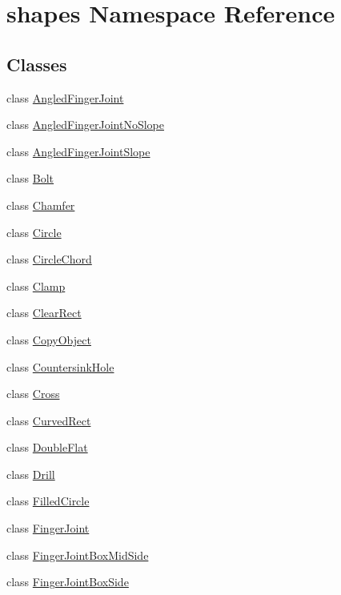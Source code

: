 \hypertarget{namespaceshapes}{}\section{shapes Namespace Reference}
\label{namespaceshapes}
\subsection*{Classes}
\begin{DoxyCompactItemize}
\item 
class \hyperlink{classshapes_1_1_angled_finger_joint}{Angled\+Finger\+Joint}
\item 
class \hyperlink{classshapes_1_1_angled_finger_joint_no_slope}{Angled\+Finger\+Joint\+No\+Slope}
\item 
class \hyperlink{classshapes_1_1_angled_finger_joint_slope}{Angled\+Finger\+Joint\+Slope}
\item 
class \hyperlink{classshapes_1_1_bolt}{Bolt}
\item 
class \hyperlink{classshapes_1_1_chamfer}{Chamfer}
\item 
class \hyperlink{classshapes_1_1_circle}{Circle}
\item 
class \hyperlink{classshapes_1_1_circle_chord}{Circle\+Chord}
\item 
class \hyperlink{classshapes_1_1_clamp}{Clamp}
\item 
class \hyperlink{classshapes_1_1_clear_rect}{Clear\+Rect}
\item 
class \hyperlink{classshapes_1_1_copy_object}{Copy\+Object}
\item 
class \hyperlink{classshapes_1_1_countersink_hole}{Countersink\+Hole}
\item 
class \hyperlink{classshapes_1_1_cross}{Cross}
\item 
class \hyperlink{classshapes_1_1_curved_rect}{Curved\+Rect}
\item 
class \hyperlink{classshapes_1_1_double_flat}{Double\+Flat}
\item 
class \hyperlink{classshapes_1_1_drill}{Drill}
\item 
class \hyperlink{classshapes_1_1_filled_circle}{Filled\+Circle}
\item 
class \hyperlink{classshapes_1_1_finger_joint}{Finger\+Joint}
\item 
class \hyperlink{classshapes_1_1_finger_joint_box_mid_side}{Finger\+Joint\+Box\+Mid\+Side}
\item 
class \hyperlink{classshapes_1_1_finger_joint_box_side}{Finger\+Joint\+Box\+Side}

\end{DoxyCompactItemize}
